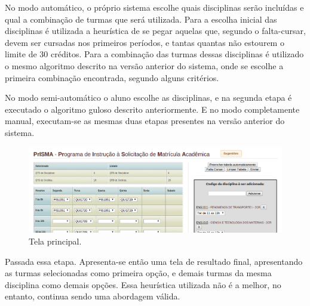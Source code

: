 \documentclass[graduacao,brazil]{ThesisPUC}
\begin{document}
No modo automático, o próprio sistema escolhe quais disciplinas serão incluídas e qual a combinação de turmas que será utilizada. Para a escolha inicial das disciplinas é utilizada a heurística de se pegar aquelas que, segundo o falta-cursar, devem ser cursadas nos primeiros períodos, e tantas quantas não estourem o limite de 30 créditos. Para a combinação das turmas dessas disciplinas é utilizado o mesmo algoritmo descrito na versão anterior do sistema, onde se escolhe a primeira combinação encontrada, segundo alguns critérios.

No modo semi-automático o aluno escolhe as disciplinas, e na segunda etapa é executado o algoritmo guloso descrito anteriormente. E no modo completamente manual, executam-se as mesmas duas etapas presentes na versão anterior do sistema.

\begin{figure}[H]
    \centering
    \includegraphics[width=\linewidth]{img/v2_horario.png}
    \caption{Tela principal.}
\end{figure}

Passada essa etapa. Apresenta-se então uma tela de resultado final, apresentando as turmas selecionadas como primeira opção, e demais turmas da mesma disciplina como demais opções. Essa heurística utilizada não é a melhor, no entanto, continua sendo uma abordagem válida.
\end{document}

